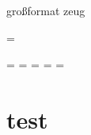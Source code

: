 	großformat zeug
	\lipsum[20-27]
	
	\endgroup
	\vsize=\textheight
	
	\newpage
	
	\paperwidth=\pdfpageheight
	\paperheight=\pdfpagewidth
	\pdfpageheight=\paperheight
	\pdfpagewidth=\paperwidth
	\headwidth=\textwidth
	
	\section{test}
	\getlength{\paperwidth}\\
	\getlength{\paperheight}\\
	\getlength{\pdfpageheight}\\
	\getlength{\pdfpagewidth}\\
	\getlength{\headwidth}\\
	\getlength{\footskip}\\
	\getlength{\textwidth}\\
	\getlength{\textheight}\\
	\getlength{\vsize}\\
	\getlength{\hsize}\\